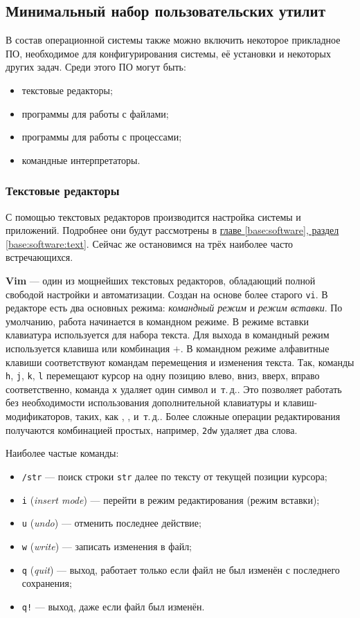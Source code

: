 \subsection{Минимальный набор пользовательских утилит}\label{base:os:structure:userutils}
В состав операционной системы также можно включить некоторое прикладное ПО, необходимое для конфигурирования системы, её установки и некоторых других задач. Среди этого ПО могут быть:
\begin{itemize}
 \item текстовые редакторы;
 \item программы для работы с файлами;
 \item программы для работы с процессами;
 \item командные интерпретаторы.
\end{itemize}

\subsubsection{Текстовые редакторы}\label{base:os:structure:userutils:texteditors}
С помощью текстовых редакторов производится настройка системы и приложений. Подробнее они будут рассмотрены в \hyperref[base:software:text]{главе \ref*{base:software}, раздел \ref*{base:software:text}}. Сейчас же остановимся на трёх наиболее часто встречающихся.

\textbf{Vim} --- один из мощнейших текстовых редакторов, обладающий полной свободой настройки и автоматизации. Создан на основе более старого \texttt{vi}. В редакторе есть два основных режима: \emph{командный режим} и \emph{режим вставки}. По умолчанию, работа начинается в командном режиме.
В режиме вставки клавиатура используется для набора текста. Для выхода в командный режим используется клавиша \Esc или комбинация \Ctrl$+$.
В командном режиме алфавитные клавиши соответствуют командам перемещения и изменения текста. Так, команды \texttt{h}, \texttt{j}, \texttt{k}, \texttt{l} перемещают курсор на одну позицию влево, вниз, вверх, вправо соответственно, команда \texttt{x} удаляет один символ и~т.\,д.. Это позволяет работать без необходимости использования дополнительной клавиатуры и клавиш-модификаторов, таких, как \Ctrl, \Alt, и~т.\,д.. Более сложные операции редактирования получаются комбинацией простых, например, \texttt{2dw} удаляет два слова.

Наиболее частые команды:
\begin{itemize}
 \item \texttt{/str} --- поиск строки \texttt{str} далее по тексту от текущей позиции курсора;
 \item \texttt{i} (\emph{insert mode}) --- перейти в режим редактирования (режим вставки);
 \item \texttt{u} (\emph{undo}) --- отменить последнее действие;
 \item \texttt{w} (\emph{write}) --- записать изменения в файл;
 \item \texttt{q} (\emph{quit}) --- выход, работает только если файл не был изменён с последнего сохранения;
 \item \texttt{q!} --- выход, даже если файл был изменён.
\end{itemize}


